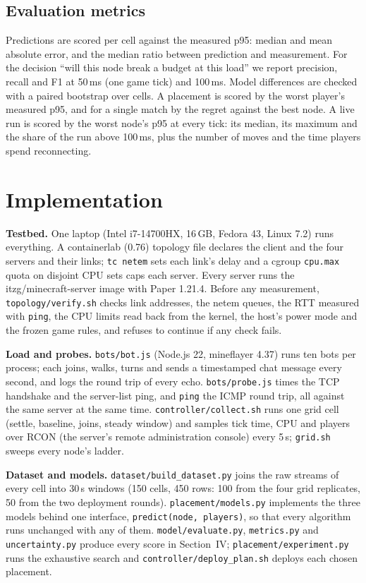 \documentclass[conference]{IEEEtran}
\begin{document}
\subsection{Evaluation metrics}
Predictions are scored per cell against the measured p95: median and mean
absolute error, and the median ratio between prediction and measurement.
For the decision ``will this node break a budget at this load'' we report
precision, recall and F1 at 50\,ms (one game tick) and 100\,ms. Model
differences are checked with a paired bootstrap over cells. A placement is
scored by the worst player's measured p95, and for a single match by the
regret against the best node. A live run is scored by the worst node's p95
at every tick: its median, its maximum and the share of the run above
100\,ms, plus the number of moves and the time players spend reconnecting.

\section{Implementation}

\textbf{Testbed.} One laptop (Intel i7-14700HX, 16\,GB, Fedora 43, Linux 7.2)
runs everything. A containerlab (0.76) topology file declares the client and the
four servers and their links; \texttt{tc netem} sets each link's delay and a
cgroup \texttt{cpu.max} quota on disjoint CPU sets caps each server. Every
server runs the itzg/minecraft-server image with Paper 1.21.4. Before any
measurement, \texttt{topology/verify.sh} checks link addresses, the netem
queues, the RTT measured with \texttt{ping}, the CPU limits read back from
the kernel, the host's power mode and the frozen game rules, and refuses to
continue if any check fails.

\textbf{Load and probes.} \texttt{bots/bot.js} (Node.js 22, mineflayer 4.37) runs
ten bots per process; each joins, walks, turns and sends a timestamped chat
message every second, and logs the round trip of every echo.
\texttt{bots/probe.js} times the TCP handshake and the server-list ping, and
\texttt{ping} the ICMP round trip, all against the same server at the same
time. \texttt{controller/collect.sh} runs one grid cell (settle, baseline,
joins, steady window) and samples tick time, CPU and players over RCON (the server's remote
administration console) every 5\,s; \texttt{grid.sh} sweeps every node's ladder.

\textbf{Dataset and models.} \texttt{dataset/build\_dataset.py} joins the
raw streams of every cell into 30\,s windows (150 cells, 450 rows: 100
from the four grid replicates, 50 from the two deployment rounds).
\texttt{placement/models.py} implements the three models behind one
interface, \texttt{predict(node, players)}, so that every algorithm runs
unchanged with any of them. \texttt{model/evaluate.py},
\texttt{metrics.py} and \texttt{uncertainty.py} produce every score in
Section~IV; \texttt{placement/experiment.py} runs the exhaustive search and
\texttt{controller/deploy\_plan.sh} deploys each chosen placement.
\end{document}
